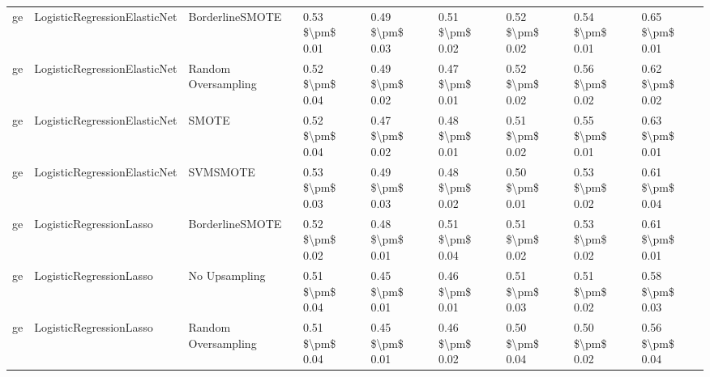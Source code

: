\begin{tabular}{lllllllll}
      ge &    LogisticRegressionElasticNet &               BorderlineSMOTE &     0.53 \$\textbackslash pm\$ 0.01 &           0.49 \$\textbackslash pm\$ 0.03 &       0.51 \$\textbackslash pm\$ 0.02 &        0.52 \$\textbackslash pm\$ 0.02 &                         0.54 \$\textbackslash pm\$ 0.01 &     0.65 \$\textbackslash pm\$ 0.01 \\
      ge &    LogisticRegressionElasticNet &           Random Oversampling &     0.52 \$\textbackslash pm\$ 0.04 &           0.49 \$\textbackslash pm\$ 0.02 &       0.47 \$\textbackslash pm\$ 0.01 &        0.52 \$\textbackslash pm\$ 0.02 &                         0.56 \$\textbackslash pm\$ 0.02 &     0.62 \$\textbackslash pm\$ 0.02 \\
      ge &    LogisticRegressionElasticNet &                         SMOTE &     0.52 \$\textbackslash pm\$ 0.04 &           0.47 \$\textbackslash pm\$ 0.02 &       0.48 \$\textbackslash pm\$ 0.01 &        0.51 \$\textbackslash pm\$ 0.02 &                         0.55 \$\textbackslash pm\$ 0.01 &     0.63 \$\textbackslash pm\$ 0.01 \\
      ge &    LogisticRegressionElasticNet &                      SVMSMOTE &     0.53 \$\textbackslash pm\$ 0.03 &           0.49 \$\textbackslash pm\$ 0.03 &       0.48 \$\textbackslash pm\$ 0.02 &        0.50 \$\textbackslash pm\$ 0.01 &                         0.53 \$\textbackslash pm\$ 0.02 &     0.61 \$\textbackslash pm\$ 0.04 \\
      ge &         LogisticRegressionLasso &               BorderlineSMOTE &     0.52 \$\textbackslash pm\$ 0.02 &           0.48 \$\textbackslash pm\$ 0.01 &       0.51 \$\textbackslash pm\$ 0.04 &        0.51 \$\textbackslash pm\$ 0.02 &                         0.53 \$\textbackslash pm\$ 0.02 &     0.61 \$\textbackslash pm\$ 0.01 \\
      ge &         LogisticRegressionLasso &                 No Upsampling &     0.51 \$\textbackslash pm\$ 0.04 &           0.45 \$\textbackslash pm\$ 0.01 &       0.46 \$\textbackslash pm\$ 0.01 &        0.51 \$\textbackslash pm\$ 0.03 &                         0.51 \$\textbackslash pm\$ 0.02 &     0.58 \$\textbackslash pm\$ 0.03 \\
      ge &         LogisticRegressionLasso &           Random Oversampling &     0.51 \$\textbackslash pm\$ 0.04 &           0.45 \$\textbackslash pm\$ 0.01 &       0.46 \$\textbackslash pm\$ 0.02 &        0.50 \$\textbackslash pm\$ 0.04 &                         0.50 \$\textbackslash pm\$ 0.02 &     0.56 \$\textbackslash pm\$ 0.04 \\

\end{tabular}
